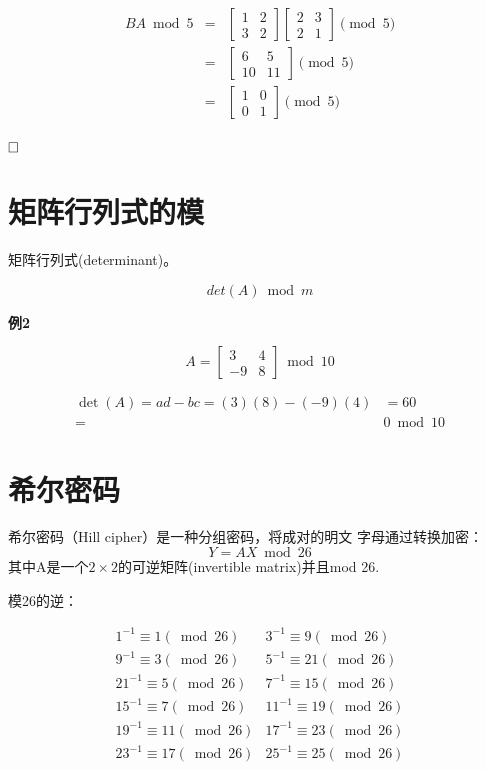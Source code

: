 \documentclass{article}
\begin{document}
\begin{eqnarray}   
\label{eq}
BA \bmod 5&=& \left[\begin{array}{ll}
1 & 2 \\
3 & 2
\end{array}\right]\left[\begin{array}{ll}
2 & 3 \\
2 & 1
\end{array}\right] \pmod{5} \nonumber \\ 
&=& \left[\begin{array}{ll}
6 & 5 \\
10 & 11
\end{array}\right] \pmod{5} \nonumber \\ 
&=& \left[\begin{array}{ll}
1 & 0 \\
0 & 1
\end{array}\right]  \pmod{5} \nonumber \\ 
\nonumber 
\end{eqnarray}

$\hfill\square$ 


\clearpage

\section{矩阵行列式的模}
矩阵行列式(determinant)。

$$det(A) \bmod m$$

\textbf{例2}

$$
A=\left[\begin{array}{cc}
3 & 4 \\
-9 & 8
\end{array}\right]  \bmod 10
$$

$$
\begin{aligned}
\operatorname{det}(A)=a d-b c=(3)(8)-(-9)(4) &=60 \\
=& 0 \bmod 10
\end{aligned}
$$

\section{希尔密码}
希尔密码（Hill cipher）是一种分组密码，将成对的明文
字母通过转换加密：
$$Y=AX \bmod 26$$其中A是一个$2 \times 2$的可逆矩阵(invertible matrix)并且mod 26.

模26的逆：

$$
\begin{array}{cc}
 {1^{-1} \equiv 1(\bmod 26)} & 3^{-1} \equiv 9(\bmod 26) \\
 9^{-1} \equiv 3(\bmod 26) & 5^{-1} \equiv 21(\bmod 26) \\ 
 21^{-1} \equiv 5(\bmod 26) & 7^{-1} \equiv 15(\bmod 26) \\ 
 15^{-1} \equiv 7(\bmod 26) & 11^{-1} \equiv 19(\bmod 26) \\
 19^{-1} \equiv 11(\bmod 26) & 17^{-1} \equiv 23(\bmod 26)\\
 23^{-1} \equiv 17(\bmod 26) & 25^{-1} \equiv 25(\bmod 26)\\
\end{array}
$$
\end{document}
